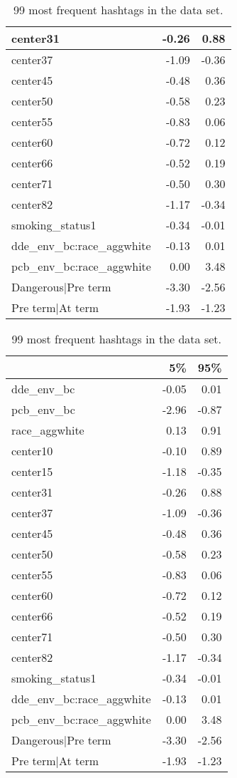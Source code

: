 \documentclass[wcp]{jmlr}%
\begin{document}
\begin{table}
\begin{tabular}[t]{l|r|r}
	\hline
	center31 & -0.26 & 0.88\\
	\hline
	center37 & -1.09 & -0.36\\
	\hline
	center45 & -0.48 & 0.36\\
	\hline
	center50 & -0.58 & 0.23\\
	\hline
	center55 & -0.83 & 0.06\\
	\hline
	center60 & -0.72 & 0.12\\
	\hline
	center66 & -0.52 & 0.19\\
	\hline
	center71 & -0.50 & 0.30\\
	\hline
	center82 & -1.17 & -0.34\\
	\hline
	smoking\_status1 & -0.34 & -0.01\\
	\hline
	dde\_env\_bc:race\_aggwhite & -0.13 & 0.01\\
	\hline
	pcb\_env\_bc:race\_aggwhite & 0.00 & 3.48\\
	\hline
	Dangerous|Pre term & -3.30 & -2.56\\
	\hline
	Pre term|At term & -1.93 & -1.23\\
	\hline
	\end{tabular}

 	\hfill
 \begin{tabular}[t]{l|r|r}
\hline
  & 5\% & 95\%\\
\hline
dde\_env\_bc & -0.05 & 0.01\\
\hline
pcb\_env\_bc & -2.96 & -0.87\\
\hline
race\_aggwhite & 0.13 & 0.91\\
\hline
center10 & -0.10 & 0.89\\
\hline
center15 & -1.18 & -0.35\\
\hline
center31 & -0.26 & 0.88\\
\hline
center37 & -1.09 & -0.36\\
\hline
center45 & -0.48 & 0.36\\
\hline
center50 & -0.58 & 0.23\\
\hline
center55 & -0.83 & 0.06\\
\hline
center60 & -0.72 & 0.12\\
\hline
center66 & -0.52 & 0.19\\
\hline
center71 & -0.50 & 0.30\\
\hline
center82 & -1.17 & -0.34\\
\hline
smoking\_status1 & -0.34 & -0.01\\
\hline
dde\_env\_bc:race\_aggwhite & -0.13 & 0.01\\
\hline
pcb\_env\_bc:race\_aggwhite & 0.00 & 3.48\\
\hline
Dangerous|Pre term & -3.30 & -2.56\\
\hline
Pre term|At term & -1.93 & -1.23\\
\hline
\end{tabular}
 	\caption{99 most frequent hashtags in the data set.}
 \end{table}
\end{document}
